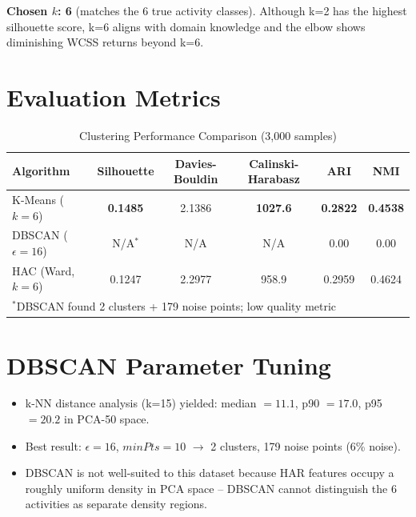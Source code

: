 \documentclass[11pt]{article}
\begin{document}
\textbf{Chosen $k$: 6} (matches the 6 true activity classes). Although k=2 has the highest silhouette score, k=6 aligns with domain knowledge and the elbow shows diminishing WCSS returns beyond k=6.

\section*{Evaluation Metrics}

\begin{table}[H]
\centering
\caption{Clustering Performance Comparison (3,000 samples)}
\begin{tabular}{lccccc}
\toprule
\textbf{Algorithm} & \textbf{Silhouette} & \textbf{Davies-Bouldin} & \textbf{Calinski-Harabasz} & \textbf{ARI} & \textbf{NMI} \\
\midrule
K-Means ($k=6$)       & \textbf{0.1485} & 2.1386 & \textbf{1027.6} & \textbf{0.2822} & \textbf{0.4538} \\
DBSCAN ($\epsilon=16$) & N/A$^*$ & N/A & N/A & 0.00 & 0.00 \\
HAC (Ward, $k=6$)     & 0.1247 & 2.2977 & 958.9 & 0.2959 & 0.4624 \\
\bottomrule
\multicolumn{6}{l}{$^*$DBSCAN found 2 clusters + 179 noise points; low quality metric}
\end{tabular}
\end{table}

\section*{DBSCAN Parameter Tuning}
\begin{itemize}
    \item k-NN distance analysis (k=15) yielded: median $= 11.1$, p90 $= 17.0$, p95 $= 20.2$ in PCA-50 space.
    \item Best result: $\epsilon = 16$, $minPts = 10$ $\to$ 2 clusters, 179 noise points (6\% noise).
    \item DBSCAN is not well-suited to this dataset because HAR features occupy a roughly uniform density in PCA space -- DBSCAN cannot distinguish the 6 activities as separate density regions.
\end{itemize}
\end{document}
